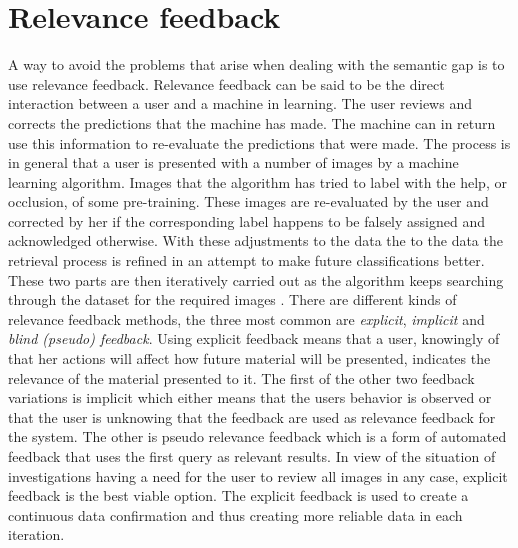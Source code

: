 \section{Relevance feedback}
\label{sec:theory:relfeed}
A way to avoid the problems that arise when dealing with the semantic gap is to use relevance feedback. 
Relevance feedback can be said to be the direct interaction between a user and a machine in learning. 
The user reviews and corrects the predictions that the machine has made. The machine can in return use this information to re-evaluate the predictions that were made.
The process is in general that a user is presented with a number of images by a machine learning algorithm. Images that the algorithm has tried to label with the help, or occlusion, of some pre-training. These images are re-evaluated by the user and corrected by her if the corresponding label happens to be falsely assigned and acknowledged otherwise. With these adjustments to the data the to the data the retrieval process is refined in an attempt to make future classifications better. These two parts are then iteratively carried out as the algorithm keeps searching through the dataset for the required images \cite{IRJET2017relevancefeedback}. There are different kinds of relevance feedback methods, the three most common are \emph{explicit}, \emph{implicit} and \emph{blind (pseudo) feedback}. Using explicit feedback means that a user, knowingly of that her actions will affect how future material will be presented, indicates the relevance of the material presented to it. The first of the other two feedback variations is implicit which either means that the users behavior is observed or that the user is unknowing that the feedback are used as relevance feedback for the system. The other is pseudo relevance feedback which is a form of automated feedback that uses the first query as relevant results. In view of the situation of investigations having a need for the user to review all images in any case, explicit feedback is the best viable option. The explicit feedback is used to create a continuous data confirmation and thus creating more reliable data in each iteration.


